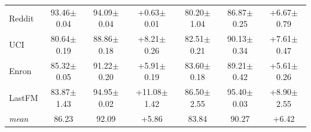 \begin{table}[t]
\begin{tabular}{lcccccc}
Reddit & 93.46{\tiny$\pm$0.04} & 94.09{\tiny$\pm$0.04} & +0.63{\tiny$\pm$0.01} & 80.20{\tiny$\pm$1.04} & 86.87{\tiny$\pm$0.25} & +6.67{\tiny$\pm$0.79} \\
UCI & 80.64{\tiny$\pm$0.19} & 88.86{\tiny$\pm$0.18} & +8.21{\tiny$\pm$0.26} & 82.51{\tiny$\pm$0.21} & 90.13{\tiny$\pm$0.34} & +7.61{\tiny$\pm$0.47} \\
Enron & 85.32{\tiny$\pm$0.05} & 91.22{\tiny$\pm$0.20} & +5.91{\tiny$\pm$0.19} & 83.60{\tiny$\pm$0.18} & 89.21{\tiny$\pm$0.42} & +5.61{\tiny$\pm$0.26} \\
LastFM & 83.87{\tiny$\pm$1.43} & 94.95{\tiny$\pm$0.02} & +11.08{\tiny$\pm$1.42} & 86.50{\tiny$\pm$2.55} & 95.40{\tiny$\pm$0.03} & +8.90{\tiny$\pm$2.55} \\
\textit{mean} & 86.23 & 92.09 & +5.86 & 83.84 & 90.27 & +6.42 \\
\bottomrule
\end{tabular}
\end{table}

